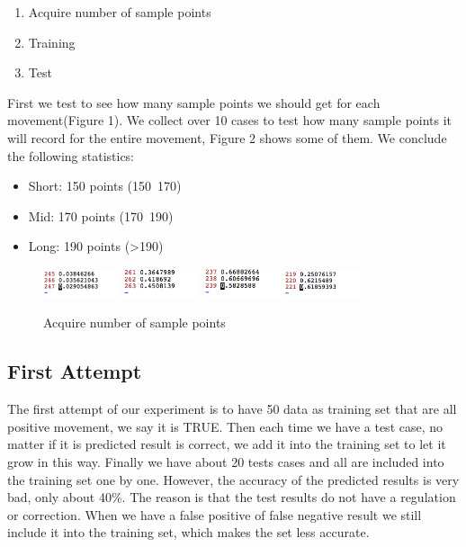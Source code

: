 \documentclass[12pt,twocolumn]{article}
\begin{document}
\begin{enumerate}
	\item Acquire number of sample points
	\item Training
	\item Test
\end{enumerate}

First we test to see how many sample points we should get for each movement(Figure 1). We collect over 10 cases to test how many sample points it will record for the entire movement, Figure 2 shows some of them. We conclude the following statistics:
\begin{itemize}
	\item Short: 150 points (150~170)
	\item Mid: 170 points (170~190)
	\item Long: 190 points (>190)
\end{itemize}

\begin{figure}[htbp]
\centering
\includegraphics[width=0.2\textwidth]{acquire2}
\includegraphics[width=0.2\textwidth]{acquire3}
\includegraphics[width=0.2\textwidth]{acquire4}
\includegraphics[width=0.2\textwidth]{acquire5}
\caption{Acquire number of sample points}
\label{fig:acquire}
\end{figure}

\subsection{First Attempt}
The first attempt of our experiment is to have 50 data as training set that are all positive movement, we say it is TRUE. Then each time we have a test case, no matter if it is predicted result is correct, we add it into the training set to let it grow in this way. Finally we have about 20 tests cases and all are included into the training set one by one. However, the accuracy of the predicted results is very bad, only about 40\%. The reason is that the test results do not have a regulation or correction. When we have a false positive of false negative result we still include it into the training set, which makes the set less accurate.
\end{document}
